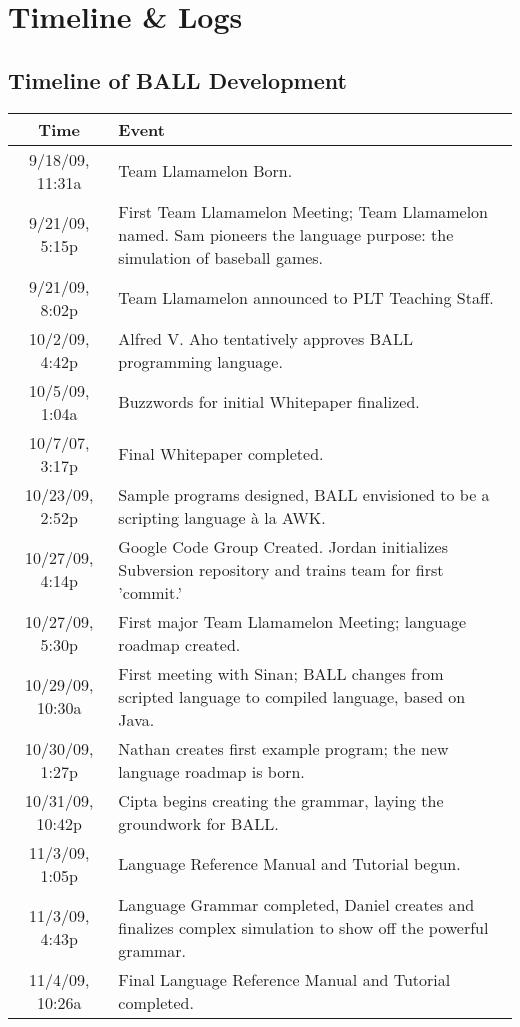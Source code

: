 \pagebreak

\section{Timeline \& Logs}\label{TimelineLogs}
\subsection{Timeline of BALL Development}

\begin{center}
\begin{longtable}{|c|p{10cm}|}
\hline
Time & Event\\
\hline
9/18/09, 11:31a & Team Llamamelon Born.\\
9/21/09, 5:15p & First Team Llamamelon Meeting; Team Llamamelon
named. Sam pioneers the language purpose: the simulation of baseball
games.\\
9/21/09, 8:02p & Team Llamamelon announced to PLT Teaching Staff.\\
10/2/09, 4:42p & Alfred V. Aho tentatively approves BALL programming
language.\\
10/5/09, 1:04a & Buzzwords for initial Whitepaper finalized.\\
10/7/07, 3:17p & Final Whitepaper completed.\\
10/23/09, 2:52p & Sample programs designed, BALL envisioned to be a
scripting language à la AWK.\\
10/27/09, 4:14p & Google Code Group Created. Jordan initializes
Subversion repository and trains team for first 'commit.'\\
10/27/09, 5:30p & First major Team Llamamelon Meeting; language
roadmap created.\\
10/29/09, 10:30a & First meeting with Sinan; BALL changes from
scripted language to compiled language, based on Java.\\
10/30/09, 1:27p & Nathan creates first example program; the new
language roadmap is born.\\
10/31/09, 10:42p & Cipta begins creating the grammar, laying the
groundwork for BALL.\\
11/3/09, 1:05p & Language Reference Manual and Tutorial begun.\\
11/3/09, 4:43p & Language Grammar completed, Daniel creates and
finalizes complex simulation to show off the powerful grammar.\\
11/4/09, 10:26a & Final Language Reference Manual and Tutorial
completed.\\

\end{longtable}
\end{center}
